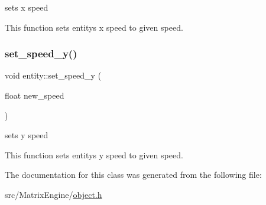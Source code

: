 sets x speed 

This function sets entity\textquotesingle{}s x speed to given speed. \mbox{\label{classentity_a64a214c123d3ede336ea6989c05063e7}} 
\subsubsection{\texorpdfstring{set\+\_\+speed\+\_\+y()}{set\_speed\_y()}}
{\footnotesize\ttfamily void entity\+::set\+\_\+speed\+\_\+y (\begin{DoxyParamCaption}\item[{float}]{new\+\_\+speed }\end{DoxyParamCaption})\hspace{0.3cm}{\ttfamily [inline]}}



sets y speed 

This function sets entity\textquotesingle{}s y speed to given speed. 

The documentation for this class was generated from the following file\+:\begin{DoxyCompactItemize}
\item 
src/\+Matrix\+Engine/\hyperlink{object_8h}{object.\+h}\end{DoxyCompactItemize}
